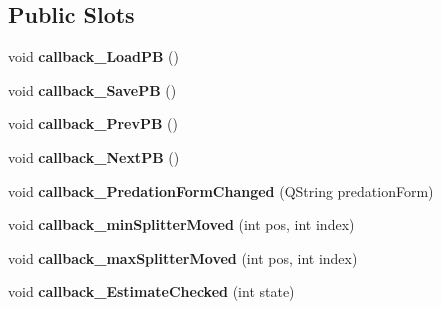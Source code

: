 \subsection*{Public Slots}
\begin{DoxyCompactItemize}
\item 
void {\bfseries callback\+\_\+\+Load\+PB} ()\hypertarget{classnmf_estimation___tab4_a3cb2313c012b009e89ec0dee8ae2ff2c}{}\label{classnmf_estimation___tab4_a3cb2313c012b009e89ec0dee8ae2ff2c}

\item 
void {\bfseries callback\+\_\+\+Save\+PB} ()\hypertarget{classnmf_estimation___tab4_ada95ab171fc464301af37f0c2e5fab06}{}\label{classnmf_estimation___tab4_ada95ab171fc464301af37f0c2e5fab06}

\item 
void {\bfseries callback\+\_\+\+Prev\+PB} ()\hypertarget{classnmf_estimation___tab4_af0a8f3b17f109784130024a24c41b938}{}\label{classnmf_estimation___tab4_af0a8f3b17f109784130024a24c41b938}

\item 
void {\bfseries callback\+\_\+\+Next\+PB} ()\hypertarget{classnmf_estimation___tab4_aa3aa8c4bc0a3681b34d0d0110a28cd6f}{}\label{classnmf_estimation___tab4_aa3aa8c4bc0a3681b34d0d0110a28cd6f}

\item 
void {\bfseries callback\+\_\+\+Predation\+Form\+Changed} (Q\+String predation\+Form)\hypertarget{classnmf_estimation___tab4_a8464fab1552a8ce762eb7639d3eeb1d3}{}\label{classnmf_estimation___tab4_a8464fab1552a8ce762eb7639d3eeb1d3}

\item 
void {\bfseries callback\+\_\+min\+Splitter\+Moved} (int pos, int index)\hypertarget{classnmf_estimation___tab4_a4d6b70124616d930f47647e2e990299f}{}\label{classnmf_estimation___tab4_a4d6b70124616d930f47647e2e990299f}

\item 
void {\bfseries callback\+\_\+max\+Splitter\+Moved} (int pos, int index)\hypertarget{classnmf_estimation___tab4_a2755ab7c6ed2727622f69f7202b417d6}{}\label{classnmf_estimation___tab4_a2755ab7c6ed2727622f69f7202b417d6}

\item 
void {\bfseries callback\+\_\+\+Estimate\+Checked} (int state)\hypertarget{classnmf_estimation___tab4_aa7c4ad0d53b389d0bc19e3f7534dd989}{}\label{classnmf_estimation___tab4_aa7c4ad0d53b389d0bc19e3f7534dd989}

\end{DoxyCompactItemize}
